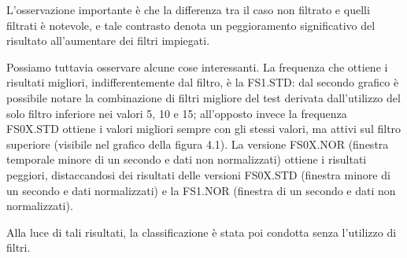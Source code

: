 L’osservazione importante è che la differenza tra il caso non filtrato e quelli filtrati è
notevole, e tale contrasto denota un peggioramento significativo del risultato all’aumentare
dei filtri impiegati.

Possiamo tuttavia osservare alcune cose interessanti. La frequenza che ottiene i risultati
migliori, indifferentemente dal filtro, è la FS1.STD: dal secondo grafico è possibile notare la
combinazione di filtri migliore del test derivata dall’utilizzo del solo filtro inferiore nei valori
5, 10 e 15; all’opposto invece la frequenza FS0X.STD ottiene i valori migliori sempre con gli
stessi valori, ma attivi sul filtro superiore (visibile nel grafico  della figura 4.1). La versione FS0X.NOR
(finestra temporale minore di un secondo e dati non normalizzati) ottiene i risultati peggiori,
distaccandosi dei risultati delle versioni FS0X.STD (finestra minore di un secondo e dati
normalizzati) e la FS1.NOR (finestra di un secondo e dati non normalizzati). 

Alla luce di tali risultati, la classificazione è stata poi condotta senza l’utilizzo di filtri.

